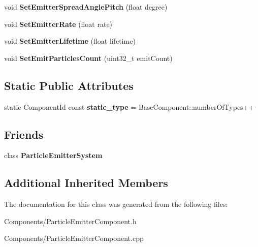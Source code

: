 \begin{DoxyCompactItemize}
void {\bfseries Set\+Emitter\+Spread\+Angle\+Pitch} (float degree)
\item 
\mbox{\label{classParticleEmitterComponent_a162492a203be9765f0d0e893d8dc26f9}} 
void {\bfseries Set\+Emitter\+Rate} (float rate)
\item 
\mbox{\label{classParticleEmitterComponent_a91972e2829066cc0bdddae9af191ec26}} 
void {\bfseries Set\+Emitter\+Lifetime} (float lifetime)
\item 
\mbox{\label{classParticleEmitterComponent_af4f1eb7736e98bc8cc74a51e62517549}} 
void {\bfseries Set\+Emit\+Particles\+Count} (uint32\+\_\+t emit\+Count)
\end{DoxyCompactItemize}
\subsection*{Static Public Attributes}
\begin{DoxyCompactItemize}
\item 
\mbox{\label{classParticleEmitterComponent_a2a53fbaf367f600cf660daa875af0efd}} 
static Component\+Id const {\bfseries static\+\_\+type} = Base\+Component\+::number\+Of\+Types++
\end{DoxyCompactItemize}
\subsection*{Friends}
\begin{DoxyCompactItemize}
\item 
\mbox{\label{classParticleEmitterComponent_a7a7b1382ea68c94bf040783d1e68bfaf}} 
class {\bfseries Particle\+Emitter\+System}
\end{DoxyCompactItemize}
\subsection*{Additional Inherited Members}


The documentation for this class was generated from the following files\+:\begin{DoxyCompactItemize}
\item 
Components/Particle\+Emitter\+Component.\+h\item 
Components/Particle\+Emitter\+Component.\+cpp\end{DoxyCompactItemize}
